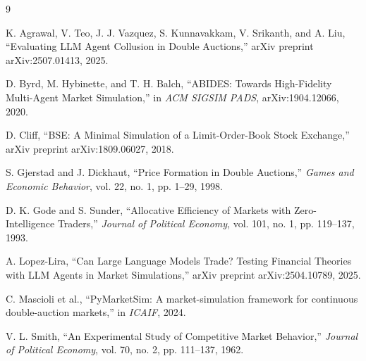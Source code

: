 \documentclass[11pt]{article}
\begin{document}
\begin{thebibliography}{9}

K. Agrawal, V. Teo, J. J. Vazquez, S. Kunnavakkam, V. Srikanth, and A. Liu, ``Evaluating LLM Agent Collusion in Double Auctions,'' arXiv preprint arXiv:2507.01413, 2025.

D. Byrd, M. Hybinette, and T. H. Balch, ``ABIDES: Towards High-Fidelity Multi-Agent Market Simulation,'' in \emph{ACM SIGSIM PADS}, arXiv:1904.12066, 2020.

D. Cliff, ``BSE: A Minimal Simulation of a Limit-Order-Book Stock Exchange,'' arXiv preprint arXiv:1809.06027, 2018.

S. Gjerstad and J. Dickhaut, ``Price Formation in Double Auctions,'' \emph{Games and Economic Behavior}, vol. 22, no. 1, pp. 1--29, 1998.

D. K. Gode and S. Sunder, ``Allocative Efficiency of Markets with Zero-Intelligence Traders,'' \emph{Journal of Political Economy}, vol. 101, no. 1, pp. 119--137, 1993.

A. Lopez-Lira, ``Can Large Language Models Trade? Testing Financial Theories with LLM Agents in Market Simulations,'' arXiv preprint arXiv:2504.10789, 2025.

C. Mascioli et al., ``PyMarketSim: A market-simulation framework for continuous double-auction markets,'' in \emph{ICAIF}, 2024.

V. L. Smith, ``An Experimental Study of Competitive Market Behavior,'' \emph{Journal of Political Economy}, vol. 70, no. 2, pp. 111--137, 1962.

\end{thebibliography}
\end{document}
